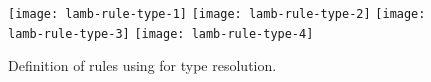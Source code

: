 \documentclass[master.tex]{subfiles}
\begin{document}
\begin{figure}[H]
    \centering
\begin{minipage}{0.7\textwidth}
    \texttt{[image: lamb-rule-type-1]}
    \texttt{[image: lamb-rule-type-2]}
    \texttt{[image: lamb-rule-type-3]}
    \texttt{[image: lamb-rule-type-4]}
\end{minipage}
\caption{Definition of rules using for type resolution.}
\end{figure}
\end{document}
